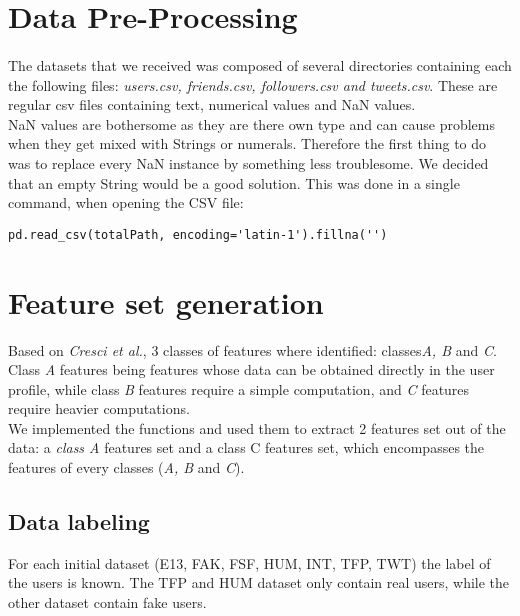 \documentclass[a4paper,11pt]{article}
\begin{document}
\section{Data Pre-Processing}
\paragraph{}
The datasets that we received was composed of several directories containing each the following files: \textit{users.csv, friends.csv, followers.csv and tweets.csv}. These are regular csv files containing text, numerical values and NaN values.\\

NaN values are bothersome as they are there own type and can cause problems when they get mixed with Strings or numerals. Therefore the first thing to do was to replace every NaN instance by something less troublesome. We decided that an empty String would be a good solution. This was done in a single command, when opening the CSV file:

\begin{lstlisting}
pd.read_csv(totalPath, encoding='latin-1').fillna('')
\end{lstlisting}

\section{Feature set generation}
Based on \textit{Cresci et al.}, 3 classes of features where identified: classes\textit{A, B} and \textit{C}. Class \textit{A} features being features whose data can be obtained directly in the user profile, while class \textit{B} features require a simple computation, and \textit{C} features require heavier computations.\\

We implemented the functions and used them to extract 2 features set out of the data: a \textit{class A} features set and a class C features set, which encompasses the features of every classes (\textit{A, B} and \textit{C}).

\subsection{Data labeling}
For each initial dataset (E13, FAK, FSF, HUM, INT, TFP, TWT) the label of the users is known. The TFP and HUM dataset only contain real users, while the other dataset contain fake users.\\
\end{document}
